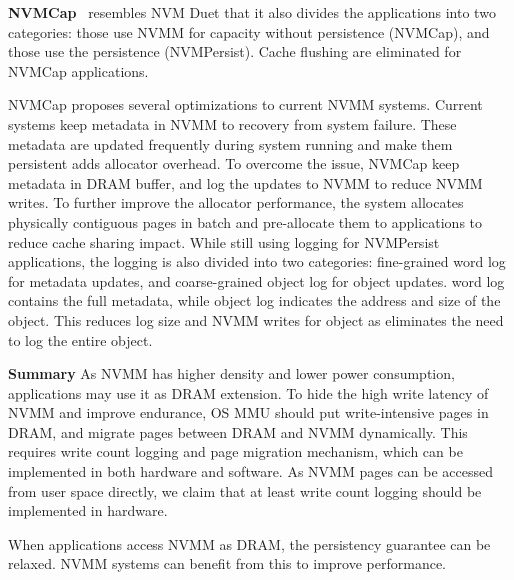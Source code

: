 \textbf{NVMCap}~\cite{NVMCap} resembles NVM Duet that it also divides
the applications into two categories: those use NVMM for capacity without
persistence (NVMCap), and those use the persistence (NVMPersist). Cache flushing
are eliminated for NVMCap applications.
 
NVMCap proposes several optimizations to current NVMM systems.
Current systems keep metadata in NVMM to recovery from system failure.
These metadata are updated frequently during system running and make
them persistent adds allocator overhead. To overcome the issue, NVMCap
keep metadata in DRAM buffer, and log the updates to NVMM to reduce NVMM
writes. To further improve the allocator performance, the system allocates
physically contiguous pages in batch and pre-allocate them to applications 
to reduce cache sharing impact. While still using logging for NVMPersist
applications, the logging is also divided into two categories: fine-grained
word log for metadata updates, and coarse-grained object log for object
updates. word log contains the full metadata, while object log indicates
the address and size of the object. This reduces log size and NVMM writes for
object as eliminates the need to log the entire object.

\textbf{Summary} As NVMM has higher density and lower power consumption,
applications may use it as DRAM extension.
To hide the high write latency of NVMM and
improve endurance, OS MMU should put write-intensive pages in DRAM, and migrate
pages between DRAM and NVMM dynamically. This requires write count logging and
page migration mechanism, which can be implemented in both hardware and
software. As NVMM pages can be accessed from user space directly, we claim 
that at least write count logging should be implemented in hardware.

When applications access NVMM as DRAM, the persistency guarantee can be relaxed.
NVMM systems can benefit from this to improve performance. 
